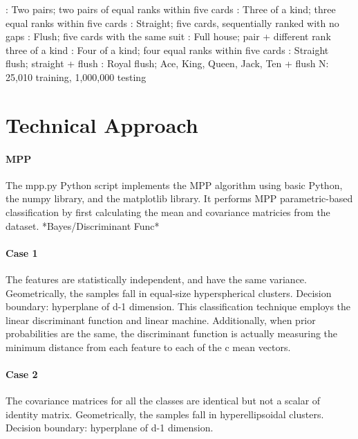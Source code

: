 \documentclass{article}
\begin{document}
: Two pairs; two pairs of equal ranks within five cards
: Three of a kind; three equal ranks within five cards
: Straight; five cards, sequentially ranked with no gaps
: Flush; five cards with the same suit
: Full house; pair + different rank three of a kind
: Four of a kind; four equal ranks within five cards
: Straight flush; straight + flush
: Royal flush; {Ace, King, Queen, Jack, Ten} + flush
\newline
\newline
N: 25,010 training, 1,000,000 testing
\newpage


\section*{Technical Approach}
\paragraph{MPP} 
The mpp.py Python script implements the MPP algorithm using basic Python, the numpy library,
and the matplotlib library.  It performs MPP parametric-based classification by first
calculating the mean and covariance matricies from the dataset.
*Bayes/Discriminant Func*
\paragraph{Case 1}
The features are statistically independent, and have the same variance.  
Geometrically, the samples fall in equal-size hyperspherical clusters.  
Decision boundary: hyperplane of d-1 dimension.  This classification technique employs the
linear discriminant function and linear machine.  Additionally, when prior probabilities are
the same, the discriminant function is actually measuring the minimum distance from each
feature to each of the c mean vectors.
\paragraph{Case 2}
The covariance matrices for all the classes are identical but not a scalar of identity matrix.
Geometrically, the samples fall in hyperellipsoidal clusters.  
Decision boundary: hyperplane of d-1 dimension.
\end{document}
